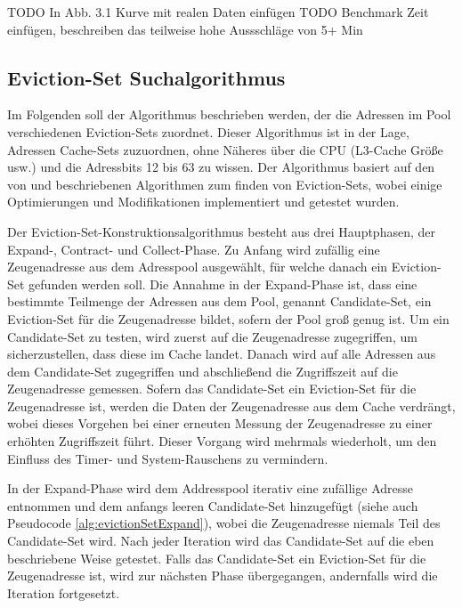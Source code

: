 TODO In Abb. 3.1 Kurve mit realen Daten einfügen
TODO Benchmark Zeit einfügen, beschreiben das teilweise hohe Aussschläge von 5+ Min


\subsection{Eviction-Set Suchalgorithmus}
\label{evictionSetSearchAlgo}

Im Folgenden soll der Algorithmus beschrieben werden, der die Adressen im Pool verschiedenen Eviction-Sets zuordnet.
Dieser Algorithmus ist in der Lage, Adressen Cache-Sets zuzuordnen, ohne Näheres über die CPU (L3-Cache Größe usw.) und die Adressbits 12 bis 63 zu wissen.
Der Algorithmus basiert auf den von \cite{DriveByPaper} und \cite{PrimeAndAbort} beschriebenen Algorithmen zum finden von Eviction-Sets, wobei einige Optimierungen und Modifikationen implementiert und getestet wurden.

Der Eviction-Set-Konstruktionsalgorithmus besteht aus drei Hauptphasen, der Expand-, Contract- und Collect-Phase. 
Zu Anfang wird zufällig eine Zeugenadresse aus dem Adresspool ausgewählt, für welche danach ein Eviction-Set gefunden werden soll.
Die Annahme in der Expand-Phase ist, dass eine bestimmte Teilmenge der Adressen aus dem Pool, genannt Candidate-Set, ein Eviction-Set für die Zeugenadresse bildet, sofern der Pool groß genug ist. 
Um ein Candidate-Set zu testen, wird zuerst auf die Zeugenadresse zugegriffen, um sicherzustellen, dass diese im Cache landet.
Danach wird auf alle Adressen aus dem Candidate-Set zugegriffen und abschließend die Zugriffszeit auf die Zeugenadresse gemessen. 
Sofern das Candidate-Set ein Eviction-Set für die Zeugenadresse ist, werden die Daten der Zeugenadresse aus dem Cache verdrängt, wobei dieses Vorgehen bei einer erneuten Messung der Zeugenadresse zu einer erhöhten Zugriffszeit führt.
Dieser Vorgang wird mehrmals wiederholt, um den Einfluss des Timer- und System-Rauschens zu vermindern.

In der Expand-Phase wird dem Addresspool iterativ eine zufällige Adresse entnommen und dem anfangs leeren Candidate-Set hinzugefügt (siehe auch Pseudocode \ref{alg:evictionSetExpand}), wobei die Zeugenadresse niemals Teil des Candidate-Set wird.
Nach jeder Iteration wird das Candidate-Set auf die eben beschriebene Weise getestet.
Falls das Candidate-Set ein Eviction-Set für die Zeugenadresse ist, wird zur nächsten Phase übergegangen, andernfalls wird die Iteration fortgesetzt.

